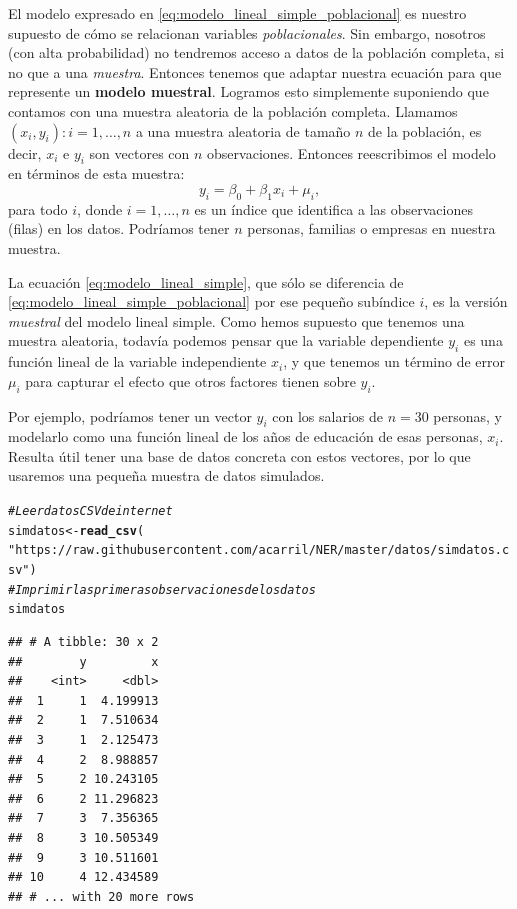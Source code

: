 \documentclass[12pt]{report}\usepackage[]{graphicx}\usepackage[]{color}
\makeatletter
\newcommand{\hlstr}[1]{\textcolor[rgb]{0.192,0.494,0.8}{#1}}%
\newcommand{\hlcom}[1]{\textcolor[rgb]{0.678,0.584,0.686}{\textit{#1}}}%
\newcommand{\hlstd}[1]{\textcolor[rgb]{0.345,0.345,0.345}{#1}}%
\newcommand{\hlkwb}[1]{\textcolor[rgb]{0.69,0.353,0.396}{#1}}%
\newcommand{\hlkwd}[1]{\textcolor[rgb]{0.737,0.353,0.396}{\textbf{#1}}}%
\newenvironment{kframe}{%
 \def\at@end@of@kframe{}%
 \ifinner\ifhmode%
  \def\at@end@of@kframe{\end{minipage}}%
  \begin{minipage}{\columnwidth}%
 \fi\fi%
 \def\FrameCommand##1{\hskip\@totalleftmargin \hskip-\fboxsep
 \colorbox{shadecolor}{##1}\hskip-\fboxsep
     \hskip-\linewidth \hskip-\@totalleftmargin \hskip\columnwidth}%
 \MakeFramed {\advance\hsize-\width
   \@totalleftmargin\z@ \linewidth\hsize
   \@setminipage}}%
 {\par\unskip\endMakeFramed%
 \at@end@of@kframe}
\newenvironment{knitrout}{}{} %
\newcommand*{\kw}[1]{\textbf{#1}\index{#1}}
\makeatother
\begin{document}
El modelo expresado en \eqref{eq:modelo_lineal_simple_poblacional} es nuestro supuesto de cómo se relacionan variables \emph{poblacionales}.
Sin embargo, nosotros (con alta probabilidad) no tendremos acceso a datos de la población completa, si no que a una \emph{muestra}.
Entonces tenemos que adaptar nuestra ecuación para que represente un \kw{modelo muestral}.
Logramos esto simplemente suponiendo que contamos con una muestra aleatoria de la población completa. Llamamos ${(x_i, y_i): i = 1, \ldots, n}$ a una muestra aleatoria de tamaño $n$ de la población, es decir, $x_i$ e $y_i$ son vectores con $n$ observaciones. Entonces reescribimos el modelo en términos de esta muestra:
\begin{equation}
y_i = \beta_0 + \beta_1 x_i + \mu_i,
\label{eq:modelo_lineal_simple}
\end{equation}
para todo $i$, donde $i = 1, \ldots, n$ es un índice que identifica a las observaciones (filas) en los datos.
Podríamos tener $n$ personas, familias o empresas en nuestra muestra.

La ecuación \eqref{eq:modelo_lineal_simple}, que sólo se diferencia de \eqref{eq:modelo_lineal_simple_poblacional} por ese pequeño subíndice $i$, es la versión \emph{muestral} del modelo lineal simple.
Como hemos supuesto que tenemos una muestra aleatoria, todavía podemos pensar que la variable dependiente $y_i$ es una función lineal de la variable independiente $x_i$, y que tenemos un término de error $\mu_i$ para capturar el efecto que otros factores tienen sobre $y_i$.

Por ejemplo, podríamos tener un vector $y_i$ con los salarios de $n=30$ personas, y modelarlo como una función lineal de los años de educación de esas personas, $x_i$. Resulta útil tener una base de datos concreta con estos vectores, por lo que usaremos una pequeña muestra de datos simulados.

\begin{knitrout}
\color{fgcolor}\begin{kframe}
\begin{alltt}
\hlcom{# Leer datos CSV de internet}
\hlstd{simdatos} \hlkwb{<-} \hlkwd{read_csv}\hlstd{(}
  \hlstr{"https://raw.githubusercontent.com/acarril/NER/master/datos/simdatos.csv"}\hlstd{)}
\hlcom{# Imprimir las primeras observaciones de los datos}
\hlstd{simdatos}
\end{alltt}
\begin{verbatim}
## # A tibble: 30 x 2
##        y         x
##    <int>     <dbl>
##  1     1  4.199913
##  2     1  7.510634
##  3     1  2.125473
##  4     2  8.988857
##  5     2 10.243105
##  6     2 11.296823
##  7     3  7.356365
##  8     3 10.505349
##  9     3 10.511601
## 10     4 12.434589
## # ... with 20 more rows
\end{verbatim}
\end{kframe}
\end{knitrout}
\end{document}
